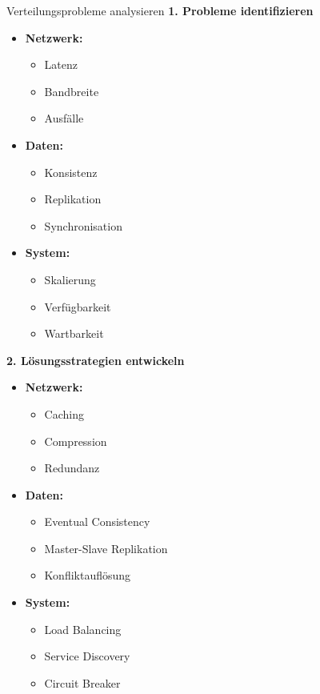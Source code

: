 \begin{KR}{Verteilungsprobleme analysieren}
\textbf{1. Probleme identifizieren}
\begin{itemize}
    \item \textbf{Netzwerk:}
    \begin{itemize}
        \item Latenz
        \item Bandbreite
        \item Ausfälle
    \end{itemize}
    \item \textbf{Daten:}
    \begin{itemize}
        \item Konsistenz
        \item Replikation
        \item Synchronisation
    \end{itemize}
    \item \textbf{System:}
    \begin{itemize}
        \item Skalierung
        \item Verfügbarkeit
        \item Wartbarkeit
    \end{itemize}
\end{itemize}

\textbf{2. Lösungsstrategien entwickeln}
\begin{itemize}
    \item \textbf{Netzwerk:}
    \begin{itemize}
        \item Caching
        \item Compression
        \item Redundanz
    \end{itemize}
    \item \textbf{Daten:}
    \begin{itemize}
        \item Eventual Consistency
        \item Master-Slave Replikation
        \item Konfliktauflösung
    \end{itemize}
    \item \textbf{System:}
    \begin{itemize}
        \item Load Balancing
        \item Service Discovery
        \item Circuit Breaker
    \end{itemize}
\end{itemize}
\end{KR}

